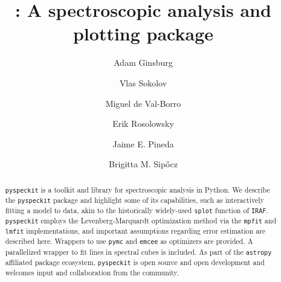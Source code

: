 \documentclass[twocolumn]{aastex63}
\newcommand{\pyspeckit}{\texttt{pyspeckit}\xspace}
\newcommand{\astropy}{\texttt{astropy}\xspace}
\begin{document}
\title{{:} A spectroscopic analysis and plotting package}

\author[0000-0001-6431-9633]{Adam Ginsburg}

\author[0000-0002-5327-4289]{Vlas Sokolov}

\author[0000-0002-0455-9384]{Miguel de Val-Borro}

\author[0000-0002-5204-2259]{Erik Rosolowsky}

\author[0000-0002-3972-1978]{Jaime E. Pineda}

\author[0000-0002-3713-6337]{Brigitta M. Sip\H{o}cz}

\begin{abstract}
\pyspeckit is a toolkit and library for spectroscopic analysis in Python. We
describe the \pyspeckit package and highlight some of its capabilities,
such as interactively fitting a model to data, akin to the historically widely-used
\texttt{splot} function of \texttt{IRAF}. \pyspeckit employs the
Levenberg-Marquardt optimization method via the \texttt{mpfit} and
\texttt{lmfit} implementations,
and important assumptions regarding error estimation are described here.
Wrappers to use \texttt{pymc} and \texttt{emcee} as optimizers are provided.
A parallelized  wrapper to fit lines in spectral cubes is included.   As part of the \astropy affiliated
package ecosystem, \pyspeckit is open source and open development and welcomes input and collaboration from
the community.
\end{abstract}
\end{document}
